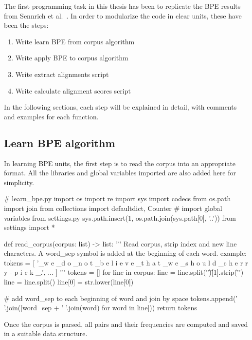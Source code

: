 The first programming task in this thesis has been to replicate the BPE results from Sennrich et al.~\cite{sennrich2015neural}. In order to modularize the code in clear units, these have been the steps:

\begin{enumerate}
    \item Write learn BPE from corpus algorithm
    \item Write apply BPE to corpus algorithm
    \item Write extract alignments script
    \item Write calculate alignment scores script
\end{enumerate}

In the following sections, each step will be explained in detail, with comments and examples for each function.

\subsection{Learn BPE algorithm}\label{subsec:learnbpe}

In learning BPE units, the first step is to read the corpus into an appropriate format. All the libraries and global variables imported are also added here for simplicity.

\begin{python}
# learn_bpe.py
import os
import re
import sys
import codecs
from os.path import join
from collections import defaultdict, Counter
# import global variables from settings.py
sys.path.insert(1, os.path.join(sys.path[0], '..'))
from settings import *

def read_corpus(corpus: list) -> list:
  '''
  Read corpus, strip index and new line characters.
  A word_sep symbol is added at the beginning of each word.
  example:
  tokens = [
      '\_w e \_d o \_n o t \_b e l i e v e 
      \_t h a t \_w e \_s h o u l d 
      \_c h e r r y - p i c k \_.',
      ...
  ]
  '''
  tokens = []
  for line in corpus:
    line = line.split('\t')[1].strip('\r\n ')
    line = line.split()
    line[0] = str.lower(line[0])

    # add word_sep to each beginning of word and join by space
    tokens.append(' '.join([word_sep + ' '.join(word) for word in line]))
  return tokens
\end{python}

Once the corpus is parsed, all pairs and their frequencies are computed and saved in a suitable data structure.

